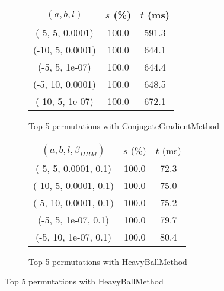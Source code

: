 \begin{figure}[H]
{\begin{subfigure}[ht]{.6\textwidth}
\begin{tabular}{|c|c|c|}
\hline
\rowcolor{gray!25}
$(a,b,l)$ & $s$ (\%) & $t$ (ms) \\
\hline
(-5, 5, 0.0001) & 100.0 & 591.3 \\
(-10, 5, 0.0001) & 100.0 & 644.1 \\
(-5, 5, 1e-07) & 100.0 & 644.4 \\
(-5, 10, 0.0001) & 100.0 & 648.5 \\
(-10, 5, 1e-07) & 100.0 & 672.1 \\
\hline
\end{tabular}
\caption{Top 5 permutations with ConjugateGradientMethod}
\label{subfig:param_comp_NegativeEntropy_ConjugateGradientMethod_GoldenSectionSearch}
\end{subfigure}
\hfill
\begin{subfigure}[ht]{.6\textwidth}
\centering
{}
\begin{tabular}{|c|c|c|}
\hline
\rowcolor{gray!25}
\multicolumn{3}{|c|}{HeavyBallMethod} \\
\hline
\rowcolor{gray!25}
$(a,b,l,\beta_{HBM})$ & $s$ (\%) & $t$ (ms) \\
\hline
(-5, 5, 0.0001, 0.1) & 100.0 & 72.3 \\
(-10, 5, 0.0001, 0.1) & 100.0 & 75.0 \\
(-5, 10, 0.0001, 0.1) & 100.0 & 75.2 \\
(-5, 5, 1e-07, 0.1) & 100.0 & 79.7 \\
(-5, 10, 1e-07, 0.1) & 100.0 & 80.4 \\
\hline
\end{tabular}
\caption{Top 5 permutations with HeavyBallMethod}
\label{subfig:param_comp_NegativeEntropy_HeavyBallMethod_GoldenSectionSearch}
\end{subfigure}
}
\end{figure}